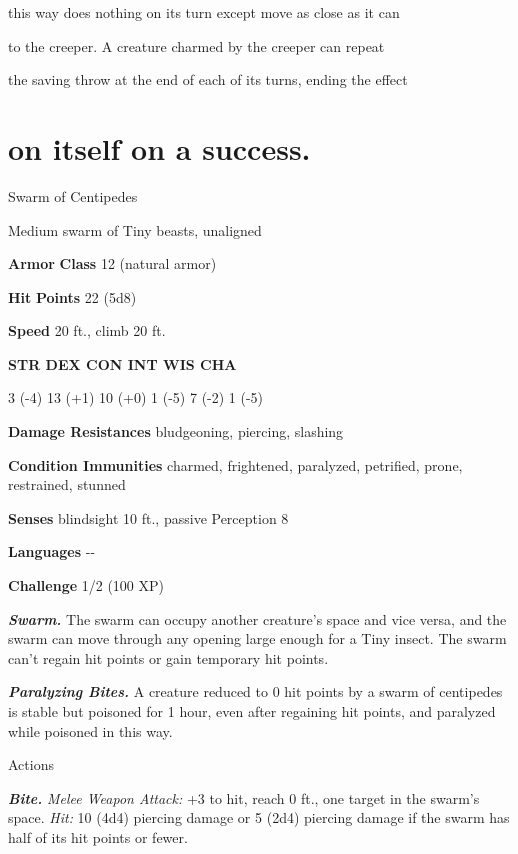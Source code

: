 this way does nothing on its turn except move as close as it can

to the creeper. A creature charmed by the creeper can repeat

the saving throw at the end of each of its turns, ending the effect

\section{on itself on a success.}\label{on-itself-on-a-success.}

Swarm of Centipedes

Medium swarm of Tiny beasts, unaligned

\textbf{Armor} \textbf{Class} 12 (natural armor)

\textbf{Hit} \textbf{Points} 22 (5d8)

\textbf{Speed} 20 ft., climb 20 ft.

\textbf{STR DEX CON INT WIS CHA}

3 (-4) 13 (+1) 10 (+0) 1 (-5) 7 (-2) 1 (-5)

\textbf{Damage Resistances} bludgeoning, piercing, slashing

\textbf{Condition Immunities} charmed, frightened, paralyzed, petrified,
prone, restrained, stunned

\textbf{Senses} blindsight 10 ft., passive Perception 8

\textbf{Languages} -\/-

\textbf{Challenge} 1/2 (100 XP)

\emph{\textbf{Swarm.}} The swarm can occupy another creature's space and
vice versa, and the swarm can move through any opening large enough for
a Tiny insect. The swarm can't regain hit points or gain temporary hit
points.

\emph{\textbf{Paralyzing Bites.}} A creature reduced to 0 hit points by
a swarm of centipedes is stable but poisoned for 1 hour, even after
regaining hit points, and paralyzed while poisoned in this way.

Actions

\emph{\textbf{Bite.}} \emph{Melee Weapon Attack:} +3 to hit, reach 0
ft., one target in the swarm's space. \emph{Hit:} 10 (4d4) piercing
damage or 5 (2d4) piercing damage if the swarm has half of its hit
points or fewer.

\section{\texorpdfstring{\\
}{ }}\label{section-4}

